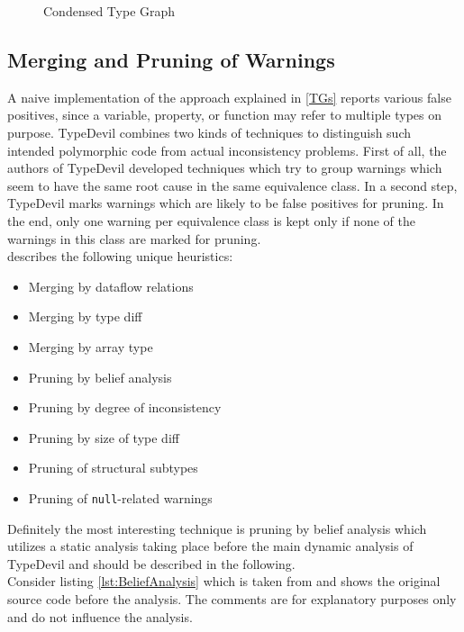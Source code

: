 \documentclass[runningheads,a4paper]{llncs}
\begin{document}
\begin{figure}[h]
\caption{Condensed Type Graph}
\label{fig:CondensedTG}
\end{figure}


\subsection{Merging and Pruning of Warnings}

A naive implementation of the approach explained in \ref{TGs} reports various false positives, since a variable, property, or function may refer to multiple types on purpose. 
TypeDevil combines two kinds of techniques to distinguish such intended polymorphic code from actual inconsistency problems. 
First of all, the authors of TypeDevil developed techniques which try to group warnings which seem to have the same root cause in the same equivalence class.
In a second step, TypeDevil marks warnings which are likely to be false positives for pruning.
In the end, only one warning per equivalence class is kept only if none of the warnings in this class are marked for pruning.\\
\cite{DBLP:conf/icse/PradelSS15} describes the following unique heuristics:
\begin{itemize}
    \item Merging by dataflow relations
    \item Merging by type diff
    \item Merging by array type
    \item Pruning by belief analysis
    \item Pruning by degree of inconsistency
    \item Pruning by size of type diff
    \item Pruning of structural subtypes
    \item Pruning of \lstinline[columns=fixed]{null}-related warnings
  \end{itemize}
Definitely the most interesting technique is pruning by belief analysis which utilizes a static analysis taking place before the main dynamic analysis of TypeDevil and should be described in the following.\\
Consider listing \ref{lst:BeliefAnalysis} which is taken from \cite{DBLP:conf/icse/PradelSS15} and shows the original source code before the analysis. The comments are for explanatory purposes only and do not influence the analysis.
\end{document}

